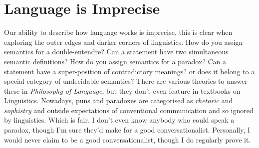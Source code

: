 \section{Language is Imprecise}
Our ability to describe how language works is imprecise, this is clear when exploring the outer edges and darker corners of linguistics. How do you assign semantics for a double-entendre? Can a statement have two simultaneous semantic definitions? How do you assign semantics for a paradox? Can a statement have a super-position of contradictory meanings? or does it belong to a special category of undecidable semantics? There are various theories to answer these in \textit{Philosophy of Language}, but they don't even feature in textbooks on Linguistics. Nowadays, puns and paradoxes are categorised as \textit{rhetoric} and \textit{sophistry} and outside expectations of conventional communication and so ignored by linguistics. Which is fair. I don't even know anybody who could speak a paradox, though I'm sure they'd make for a good conversationalist. Personally, I would never claim to be a good conversationalist, though I do regularly prove it.



